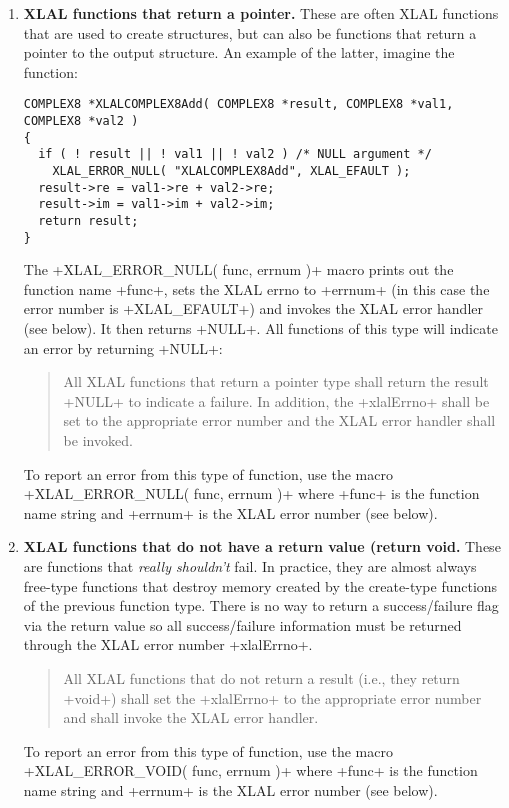 \documentclass[10pt]{ligodcc}
\makeatletter
\def\verb{\relax\ifmmode\hbox\else\leavevmode\null\fi
  \bgroup
    \color{blue}\small
    \verb@eol@error \let\do\@makeother \dospecials
    \verbatim@font\@noligs
    \@ifstar\@sverb\@verb}
\renewcommand{\texttt}[1]{{\ttfamily\color{blue}#1}}
\newlength{\fminilength}
\newenvironment{fminipage}[1][\linewidth]
  {\setlength{\fminilength}{#1-2\fboxsep-2\fboxrule}%
   \begin{lrbox}{\fminibox}\begin{minipage}{\fminilength}}
  {\end{minipage}\end{lrbox}\noindent\fbox{\usebox{\fminibox}}}
\newenvironment{lalrule}{\begin{quote}\color{red}\begin{fminipage}}
  {\end{fminipage}\end{quote}}
\makeatother
\begin{document}
\begin{enumerate}
\item \textbf{XLAL functions that return a pointer.}  These are often XLAL
functions that are used to create structures, but can also be functions that
return a pointer to the output structure.  An example of the latter, imagine
the function:
\begin{verbatim}
COMPLEX8 *XLALCOMPLEX8Add( COMPLEX8 *result, COMPLEX8 *val1, COMPLEX8 *val2 )
{
  if ( ! result || ! val1 || ! val2 ) /* NULL argument */
    XLAL_ERROR_NULL( "XLALCOMPLEX8Add", XLAL_EFAULT );
  result->re = val1->re + val2->re;
  result->im = val1->im + val2->im;
  return result;
}
\end{verbatim}
The \verb+XLAL_ERROR_NULL( func, errnum )+ macro prints out the function name
\verb+func+, sets the XLAL errno to \verb+errnum+ (in this case the
error number is \verb+XLAL_EFAULT+) and invokes the XLAL error handler
(see below).  It then returns \verb+NULL+.  All functions of this type will
indicate an error by returning \verb+NULL+:
\begin{lalrule}
All XLAL functions that return a pointer type shall return the result
\verb+NULL+ to indicate a failure.
In addition, the \verb+xlalErrno+ shall be set to the appropriate error number
and the XLAL error handler shall be invoked.
\end{lalrule}
To report an error from this type of function, use the macro
\verb+XLAL_ERROR_NULL( func, errnum )+ where \verb+func+ is the function name
string and \verb+errnum+ is the XLAL error number (see below).

\item \textbf{XLAL functions that do not have a return value (return
\texttt{void}.}  These are functions that \emph{really shouldn't} fail.  In
practice, they are almost always free-type functions that destroy memory
created by the create-type functions of the previous function type.  There is
no way to return a success/failure flag via the return value so all
success/failure information must be returned through the XLAL error number
\verb+xlalErrno+.
\begin{lalrule}
All XLAL functions that do not return a result (i.e., they return \verb+void+)
shall set the \verb+xlalErrno+ to the appropriate error number and shall
invoke the XLAL error handler.
\end{lalrule}
To report an error from this type of function, use the macro
\verb+XLAL_ERROR_VOID( func, errnum )+ where \verb+func+ is the function name
string and \verb+errnum+ is the XLAL error number (see below).
\end{enumerate}
\end{document}
